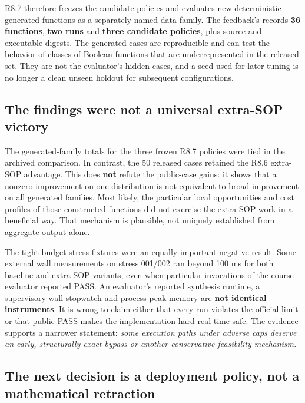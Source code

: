 R8.7 therefore freezes the candidate policies and evaluates new deterministic generated functions as a separately named data family. The feedback's  records \textbf{36 functions}, \textbf{two runs} and \textbf{three candidate policies}, plus source and executable digests. The generated cases are reproducible and can test the behavior of classes of Boolean functions that are underrepresented in the released set. They are not the evaluator's hidden cases, and a seed used for later tuning is no longer a clean unseen holdout for subsequent configurations.

\subsection{The findings were not a universal extra-SOP victory}\label{the-findings-were-not-a-universal-extra-sop-victory}

The generated-family totals for the three frozen R8.7 policies were tied in the archived comparison. In contrast, the 50 released cases retained the R8.6 extra-SOP advantage. This does \textbf{not} refute the public-case gains: it shows that a nonzero improvement on one distribution is not equivalent to broad improvement on all generated families. Most likely, the particular local opportunities and cost profiles of those constructed functions did not exercise the extra SOP work in a beneficial way. That mechanism is plausible, not uniquely established from aggregate output alone.

The tight-budget stress fixtures were an equally important negative result. Some external wall measurements on stress 001/002 ran beyond 100 ms for both baseline and extra-SOP variants, even when particular invocations of the course evaluator reported PASS. An evaluator's reported synthesis runtime, a supervisory wall stopwatch and process peak memory are \textbf{not identical instruments}. It is wrong to claim either that every run violates the official limit or that public PASS makes the implementation hard-real-time safe. The evidence supports a narrower statement: \emph{some execution paths under adverse caps deserve an early, structurally exact bypass or another conservative feasibility mechanism.}

\subsection{The next decision is a deployment policy, not a mathematical retraction}\label{the-next-decision-is-a-deployment-policy-not-a-mathematical-retraction}

